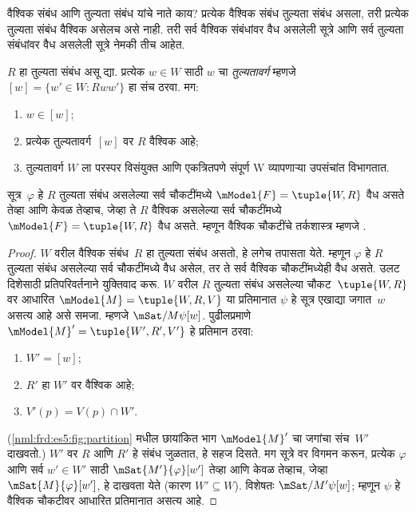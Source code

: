 वैश्विक संबंध आणि तुल्यता संबंध यांचे नाते काय?
प्रत्येक वैश्विक संबंध तुल्यता संबंध असला, तरी
प्रत्येक तुल्यता संबंध वैश्विक असेलच असे नाही.
तरी सर्व वैश्विक संबंधांवर वैध असलेली सूत्रे
आणि सर्व तुल्यता संबंधांवर वैध असलेली सूत्रे
नेमकी तीच आहेत.

\begin{prop}
  $R$ हा तुल्यता संबंध असू द्या. प्रत्येक $w \in W$
  साठी $w$ चा \emph{तुल्यतावर्ग} म्हणजे
  $[w] = \{w'\in W :
  Rww'\}$ हा संच ठरवा. मग:
  \begin{enumerate}
  \item $w \in [w]$;
  \item प्रत्येक तुल्यतावर्ग~$[w]$ वर $R$ वैश्विक आहे;
  \item तुल्यतावर्ग $W$ ला परस्पर विसंयुक्त आणि
    एकत्रितपणे संपूर्ण W व्यापणाऱ्या उपसंचांत विभागतात.
  \end{enumerate}
\end{prop}

\begin{prop}\label{nml:frd:es5:prop:S5=univ}
  सूत्र~$\varphi$ हे $R$ तुल्यता संबंध असलेल्या
  सर्व चौकटींमध्ये $\mModel{F} =\tuple{W,R}$ वैध
  असते तेव्हा आणि केवळ तेव्हाच, जेव्हा ते $R$
  वैश्विक असलेल्या सर्व चौकटींमध्ये
  $\mModel{F} =\tuple{W,R}$ वैध असते. म्हणून
  वैश्विक चौकटींचे तर्कशास्त्र म्हणजे .
\end{prop}

\begin{proof}
  $W$ वरील वैश्विक संबंध~$R$ हा तुल्यता संबंध असतो,
  हे लगेच तपासता येते. म्हणून $\varphi$ हे $R$ तुल्यता
  संबंध असलेल्या सर्व चौकटींमध्ये वैध असेल, तर ते
  सर्व वैश्विक चौकटींमध्येही वैध असते. उलट दिशेसाठी
  प्रतिपरिवर्तनाने युक्तिवाद करू. $W$ वरील $R$
  तुल्यता संबंध असलेल्या चौकट~$\tuple{W,R}$ वर
  आधारित $\mModel{M} = \tuple{W, R, V}$ या
  प्रतिमानात $\psi$ हे सूत्र एखाद्या जगात~$w$
  असत्य आहे असे समजा. म्हणजे $\mSat/{M}{\psi}[w]$.
  पुढीलप्रमाणे $\mModel{M}' = \tuple{W',
    R', V'}$ हे प्रतिमान ठरवा:
  \begin{enumerate}
  \item $W' = [w]$;
  \item $R'$ हा $W'$ वर वैश्विक आहे;
  \item $V'(p) = V(p) \cap W'$.
  \end{enumerate}
  (\ref{nml:frd:es5:fig:partition} मधील छायांकित भाग
  $\mModel{M}'$ चा जगांचा संच~$W'$ दाखवतो.)
  $W'$ वर $R$ आणि $R'$ हे संबंध जुळतात, हे सहज
  दिसते. मग सूत्रे वर विगमन करून, प्रत्येक
  $\varphi$ आणि सर्व $w' \in W'$ साठी
  $\mSat{M'}{\varphi}[w']$ तेव्हा आणि केवळ तेव्हाच,
  जेव्हा $\mSat{M}{\varphi}[w']$, हे दाखवता येते
  (कारण $W'
  \subseteq W$). विशेषतः $\mSat/{M'}{\psi}[w]$;
  म्हणून $\psi$ हे वैश्विक चौकटीवर आधारित
  प्रतिमानात असत्य आहे.
\end{proof}

